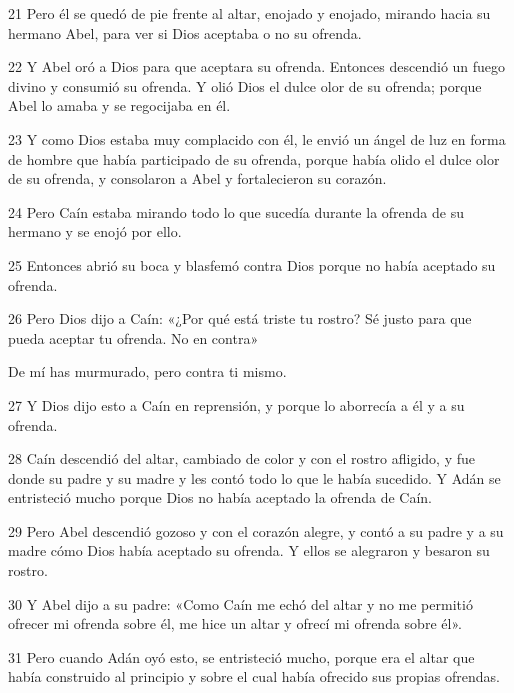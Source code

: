 \par 21 Pero él se quedó de pie frente al altar, enojado y enojado, mirando hacia su hermano Abel, para ver si Dios aceptaba o no su ofrenda.

\par 22 Y Abel oró a Dios para que aceptara su ofrenda. Entonces descendió un fuego divino y consumió su ofrenda. Y olió Dios el dulce olor de su ofrenda; porque Abel lo amaba y se regocijaba en él.

\par 23 Y como Dios estaba muy complacido con él, le envió un ángel de luz en forma de hombre que había participado de su ofrenda, porque había olido el dulce olor de su ofrenda, y consolaron a Abel y fortalecieron su corazón.

\par 24 Pero Caín estaba mirando todo lo que sucedía durante la ofrenda de su hermano y se enojó por ello.

\par 25 Entonces abrió su boca y blasfemó contra Dios porque no había aceptado su ofrenda.

\par 26 Pero Dios dijo a Caín: «¿Por qué está triste tu rostro? Sé justo para que pueda aceptar tu ofrenda. No en contra»

De mí has ​​murmurado, pero contra ti mismo.

\par 27 Y Dios dijo esto a Caín en reprensión, y porque lo aborrecía a él y a su ofrenda.

\par 28 Caín descendió del altar, cambiado de color y con el rostro afligido, y fue donde su padre y su madre y les contó todo lo que le había sucedido. Y Adán se entristeció mucho porque Dios no había aceptado la ofrenda de Caín.

\par 29 Pero Abel descendió gozoso y con el corazón alegre, y contó a su padre y a su madre cómo Dios había aceptado su ofrenda. Y ellos se alegraron y besaron su rostro.

\par 30 Y Abel dijo a su padre: «Como Caín me echó del altar y no me permitió ofrecer mi ofrenda sobre él, me hice un altar y ofrecí mi ofrenda sobre él».

\par 31 Pero cuando Adán oyó esto, se entristeció mucho, porque era el altar que había construido al principio y sobre el cual había ofrecido sus propias ofrendas.

